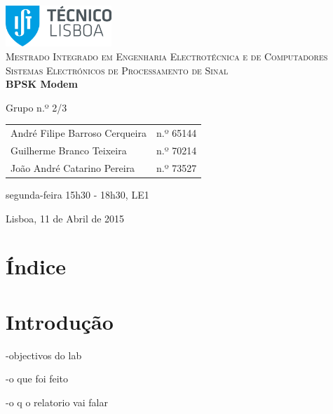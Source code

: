 \documentclass[11pt]{article}
\begin{document}
	
\begin{titlepage}
	\begin{center}
		
		\hfill \break
		\hfill \break
		
		\includegraphics[width=0.3\textwidth]{./logo}~\\[1cm]
		
		\textsc{\Large Mestrado Integrado em Engenharia Electrotécnica e de Computadores}\\[1.5cm]
		\textsc{\huge Sistemas Electrónicos de Processamento de Sinal}\\[0.25cm]
		
		{\huge \bfseries BPSK Modem \\[1.2cm]}
		
		Grupo n.º 2/3 \vspace{0.3cm}
		
		\begin{tabular}{l r}
			André Filipe Barroso Cerqueira \hspace{1mm} & n.º 65144 \\
			Guilherme Branco Teixeira \hspace{1mm} & n.º 70214  \\
			João André Catarino Pereira & n.º 73527
		\end{tabular}
		
		\hfill
		\hfill
		
		segunda-feira 15h30 - 18h30, LE1
		
		\vfill
		
		{\large Lisboa, 11 de Abril de 2015} 
		
	\end{center}
\end{titlepage}

\section{Índice}

\section{Introdução}

-objectivos do lab  

-o que foi feito

-o q o relatorio vai falar
\end{document}
